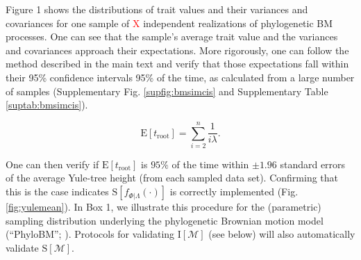 \documentclass[oneside]{article}
\begin{document}
\begin{tcolorbox}[breakable, width=\textwidth, colback=gray!10, boxrule=0pt,
  title=Box 1: Models characterized by well-known parametric distributions, fonttitle=\bfseries]
Figure 1 shows the distributions of trait values and their variances and covariances for one sample of \textcolor{red}{X} independent realizations of phylogenetic BM processes. 
One can see that the sample's average trait value and the variances and covariances approach their expectations. 
More rigorously, one can follow the method described in the main text and verify that those expectations fall within their 95\% confidence intervals 95\% of the time, as calculated from a large number of samples (Supplementary Fig. \ref{supfig:bmsimcis} and Supplementary Table \ref{suptab:bmsimcis}).
%
%
\end{tcolorbox}

\begin{equation}
  \text{E}[t_{\text{root}}] = \sum_{i=2}^{n}\frac{1}{i\lambda}.
  \label{eq:yule}
\end{equation}

\noindent One can then verify if $\text{E}[t_{\text{root}}]$ is $95\%$ of the time within $\pm 1.96$ standard errors of the average Yule-tree height (from each sampled data set).
Confirming that this is the case indicates $\text{S}[f_{\Phi|\Lambda}(\cdot)]$ is correctly implemented (Fig. \ref{fig:yulemean}).
In Box 1, we illustrate this procedure for the (parametric) sampling distribution underlying the phylogenetic Brownian motion model (``PhyloBM''; \citealp{felsenstein73}).
Protocols for validating $\text{I}[\mathcal{M}]$ (see below) will also automatically validate $\text{S}[\mathcal{M}]$.
\end{document}
